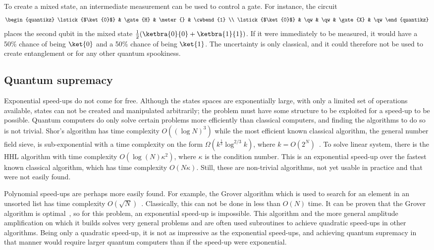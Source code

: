 To create a mixed state, an intermediate measurement can be used to control a gate.
For instance, the circuit
\begin{equation}
    \begin{quantikz}
        \lstick{$\ket{0}$} & \gate{H} & \meter{} & \cwbend{1} \\
        \lstick{$\ket{0}$} & \qw & \qw & \gate{X} & \qw
    \end{quantikz}
\end{equation}
places the second qubit in the mixed state $\frac{1}{2}(\ketbra{0}{0} + \ketbra{1}{1})$.
If it were immediately to be measured, it would have a 50\% chance of being $\ket{0}$ and a 50\% chance of being $\ket{1}$.
The uncertainty is only classical, and it could therefore not be used to create entanglement or for any other quantum spookiness.

\subsection{Quantum supremacy}
Exponential speed-ups do not come for free.
Although the states spaces are exponentially large, with only a limited set of operations available, states can not be created and manipulated arbitrarily; the problem must have some structure to be exploited for a speed-up to be possible.
Quantum computers do only solve certain problems more efficiently than classical computers, and finding the algorithms to do so is not trivial.
Shor's algorithm has time complexity $O((\log N)^3)$ while the most efficient known classical algorithm, the general number field sieve, is sub-exponential with a time complexity on the form $\Omega(k^{\frac{1}{3}}\log^{2/3}k)$, where $k=O(2^N)$~\autocite{dervovic2018}.
To solve linear system, there is the HHL algorithm with time complexity $O(\log(N)\kappa^2)$, where $\kappa$ is the condition number.
This is an exponential speed-up over the fastest known classical algorithm\footnotemark{}, which has time complexity $O(N \kappa)$.
Still, these are non-trivial algorithms, not yet usable in practice and that were not easily found.


Polynomial speed-ups are perhaps more easily found.
For example, the Grover algorithm which is used to search for an element in an unsorted list has time complexity $O(\sqrt{N})$~\autocite{grover1996}.
Classically, this can not be done in less than $O(N)$ time.
It can be proven that the Grover algorithm is optimal~\autocite{zalka1999}, so for this problem, an exponential speed-up is impossible.
This algorithm and the more general amplitude amplification on which it builds solves very general problems and are often used subroutines to achieve quadratic speed-ups in other algorithms.
Being only a quadratic speed-up, it is not as impressive as the exponential speed-ups, and achieving quantum supremacy in that manner would require larger quantum computers than if the speed-up were exponential.


